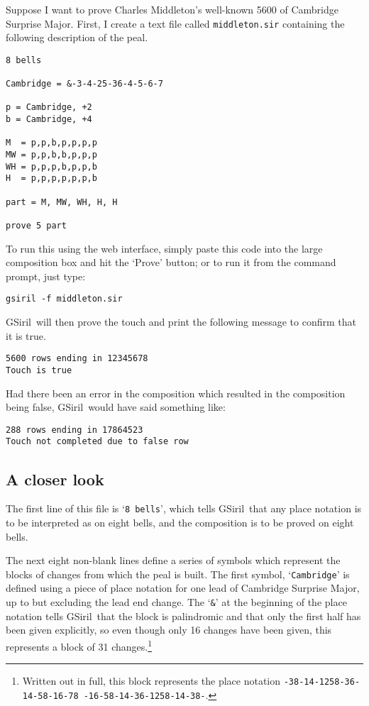 \documentclass[a4paper,11pt,oneside]{book}
\makeatletter
\newcommand{\oi}[1]{\index{#1@{\hspace*{-\optwidth}\texttt{-}\texttt{#1}}}}
\def\gsiril{GSiril}
\makeatother
\begin{document}
Suppose I want to prove Charles Middleton's 
well-known 5600 of Cambridge Surprise Major.  First, I create a text file 
called \texttt{middleton.sir} containing the following description of
the peal. 

\begin{Verbatim}
8 bells

Cambridge = &-3-4-25-36-4-5-6-7

p = Cambridge, +2
b = Cambridge, +4

M  = p,p,b,p,p,p,p
MW = p,p,b,b,p,p,p
WH = p,p,p,b,p,p,b
H  = p,p,p,p,p,p,b

part = M, MW, WH, H, H

prove 5 part
\end{Verbatim}

To run this using the web interface, simply paste this code into the
large composition box and hit the `Prove' button; or to run it from the
command prompt, just type\oi{f}:

\begin{Verbatim}
gsiril -f middleton.sir
\end{Verbatim}

\gsiril\ will then prove the touch and print the following message to
confirm that it is true.

\begin{Verbatim}
5600 rows ending in 12345678
Touch is true
\end{Verbatim}

Had there been an error in the composition which resulted in the composition
being false, \gsiril\ would have said something like:

\begin{Verbatim}
288 rows ending in 17864523
Touch not completed due to false row
\end{Verbatim}


\subsection{A closer look}

The first line of this file is `\texttt{8 bells}', which tells 
\gsiril\ that any place notation is to be interpreted as on eight bells,
and the composition is to be proved on eight bells.

The next eight non-blank lines define a series of symbols which
represent the blocks of changes from which the peal is built.  The first
symbol, `\texttt{Cambridge}' is defined using a piece of place notation
for one lead of Cambridge Surprise Major, up to but excluding the lead
end change.  The `\verb+&+' at the beginning of the place notation tells
\gsiril\ that the block is palindromic and that only the first half has
been given explicitly, so even though only 16 changes have been given,
this represents a block of 31 changes.\footnote{Written out in full, this
block represents the place notation \texttt{-38-14-1258-36-14-58-16-78
-16-58-14-36-1258-14-38-}.}
\end{document}
